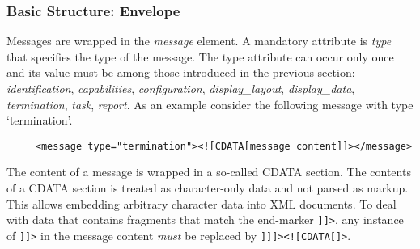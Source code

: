 \documentclass{article}
\begin{document}


   \subsubsection{Basic Structure: Envelope} \label{ss:structure}

    \noindent Messages are wrapped in the \textit{message} element. A mandatory
    attribute is \textit{type} that specifies the type of the message. The type
    attribute can occur only once and its value must be among those introduced
    in the previous section: \textit{identification}, \textit{capabilities},
    \textit{configuration}, \textit{display\_layout}, \textit{display\_data},
    \textit{termination}, \textit{task},
    \textit{report}. As an example consider the following message with type
    `termination'.
 
    \begin{verbatim}
     <message type="termination"><![CDATA[message content]]></message>\end{verbatim}

    \noindent The content of a message is wrapped in a so-called CDATA section. The
    contents of a CDATA section is treated as character-only data and not
    parsed as markup. This allows embedding arbitrary character data into XML
    documents. To deal with data that contains fragments that match the
    end-marker \verb']]>', any instance of \verb']]>' in the message content
    \textit{must} be replaced by \verb']]]><![CDATA[]>'.
    
\end{document}
